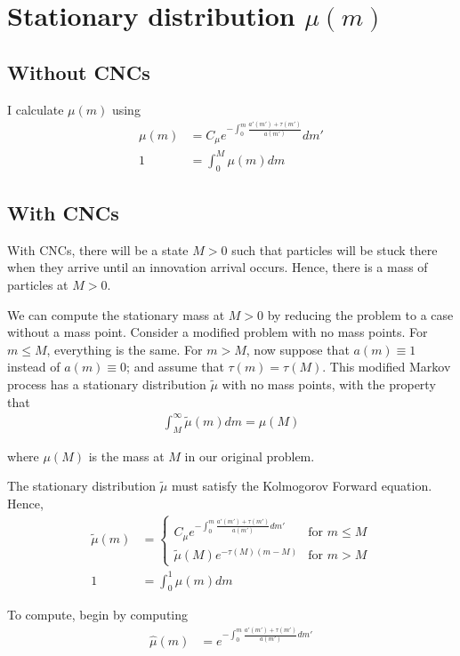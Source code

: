\documentclass[12pt,english]{article}
\theoremstyle{remark}
\begin{document}
\section{Stationary distribution $\mu(m)$}

\subsection{Without CNCs}

I calculate $\mu(m)$ using 
\begin{align*}
	\mu(m) &= C_{\mu} e^{-\int_0^m \frac{a'(m') + \tau(m')}{a(m')}}dm' \\
	1 &= \int_0^{M} \mu(m)dm
\end{align*}

\subsection{With CNCs}

With CNCs, there will be a state $M > 0$ such that particles will be stuck there when they arrive until an innovation arrival occurs. Hence, there is a mass of particles at $M > 0$. 

We can compute the stationary mass at $M > 0$ by reducing the problem to a case without a mass point. Consider a modified problem with no mass points. For $m \le M$, everything is the same. For $m > M$, now suppose that $a(m) \equiv 1$ instead of $a(m) \equiv 0$; and assume that $\tau(m) = \tau(M)$. This modified Markov process has a stationary distribution $\tilde{\mu}$ with no mass points, with the property that 
\begin{align*}
\int_M^{\infty} \tilde{\mu}(m) dm = \mu(M)
\end{align*}

where $\mu(M)$ is the mass at $M$ in our original problem. 

The stationary distribution $\tilde{\mu}$ must satisfy the Kolmogorov Forward equation. Hence, 
\begin{align*}
\tilde{\mu}(m) &= \begin{cases}
C_{\mu} e^{-\int_0^m \frac{a'(m') + \tau(m')}{a(m')}dm'} &\textrm{for $m \le M$} \\
\tilde{\mu}(M) e^{-\tau(M)(m-M)} &\textrm{for $m > M$}
\end{cases} \\
1 &= \int_0^1 \mu(m) dm
\end{align*}

To compute, begin by computing 
\begin{align*}
\hat{\mu}(m) &= e^{-\int_0^m \frac{a'(m') + \tau(m')}{a(m')}dm'}
\end{align*}
\end{document}
